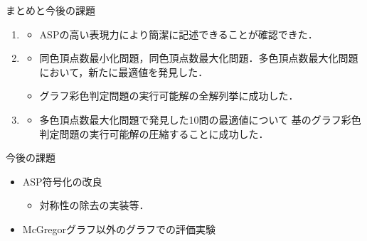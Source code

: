 \documentclass[dvipdfmx,11pt]{beamer}
\begin{document}
\begin{frame}{まとめと今後の課題}
 \begin{enumerate}
  \item {}
        \begin{itemize}
         \item ASPの高い表現力により簡潔に記述できることが確認できた．
        \end{itemize}
  \item {}
        \begin{itemize}
         \item 同色頂点数最小化問題，同色頂点数最大化問題．多色頂点数最大化問題
               において，新たに最適値を発見した．%
         \item グラフ彩色判定問題の実行可能解の全解列挙に成功した．
        \end{itemize}
  \item {}
        \begin{itemize}
         \item 多色頂点数最大化問題で発見した10問の最適値について
               基のグラフ彩色判定問題の実行可能解の圧縮することに成功した．%
        \end{itemize}
 \end{enumerate}

 \begin{block}{今後の課題}
  \begin{itemize}
   \item ASP符号化の改良
         \begin{itemize}
          \item 対称性の除去の実装等．
         \end{itemize}
   \item McGregorグラフ以外のグラフでの評価実験
  \end{itemize}
 \end{block}
\end{frame}

\end{document}
